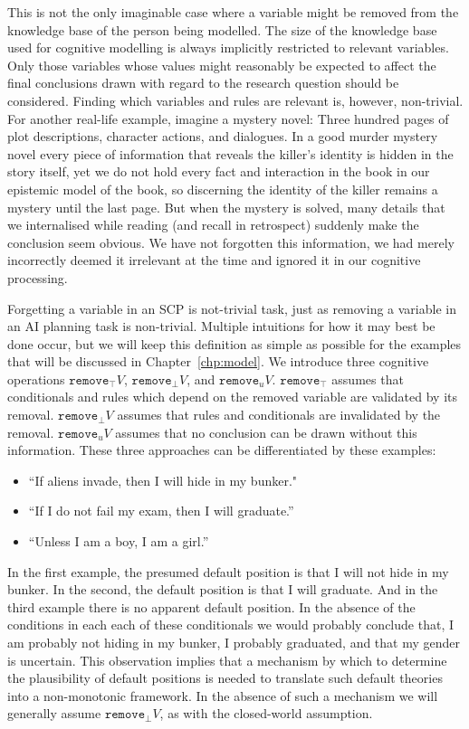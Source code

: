 This is not the only imaginable case where a variable might be removed from the knowledge base of the person being modelled. The size of the knowledge base used for cognitive modelling is always implicitly restricted to relevant variables. Only those variables whose values might reasonably be expected to affect the final conclusions drawn with regard to the research question should be considered. Finding which variables and rules are relevant is, however, non-trivial. For another real-life example, imagine a mystery novel: Three hundred pages of plot descriptions, character actions, and dialogues. In a good murder mystery novel every piece of information that reveals the killer's identity is hidden in the story itself, yet we do not hold every fact and interaction in the book in our epistemic model of the book, so discerning the identity of the killer remains a mystery until the last page. But when the mystery is solved, many details that we internalised while reading (and recall in retrospect) suddenly make the conclusion seem obvious. We have not forgotten this information, we had merely incorrectly deemed it irrelevant at the time and ignored it in our cognitive processing.

Forgetting a variable in an SCP is not-trivial task, just as removing a variable in an AI planning task is non-trivial. Multiple intuitions for how it may best be done occur, but we will keep this definition as simple as possible for the examples that will be discussed in Chapter~\ref{chp:model}. We introduce three cognitive operations $\texttt{remove}_\top V$, $\texttt{remove}_\bot V$, and $\texttt{remove}_u V$. $\texttt{remove}_\top$ assumes that conditionals and rules which depend on the removed variable are validated by its removal. $\texttt{remove}_\bot V$ assumes that rules and conditionals are invalidated by the removal. $\texttt{remove}_u V$ assumes that no conclusion can be drawn without this information.  These three approaches can be differentiated by these examples:

\begin{itemize}
\item ``If aliens invade, then I will hide in my bunker."
\item ``If I do not fail my exam, then I will graduate.''
\item ``Unless I am a boy, I am a girl.''
\end{itemize}

In the first example, the presumed default position is that I will not hide in my bunker. In the second, the default position is that I will graduate. And in the third example there is no apparent default position. In the absence of the conditions in each each of these conditionals we would probably conclude that, I am probably not hiding in my bunker, I probably graduated, and that my gender is uncertain. This observation implies that a mechanism by which to determine the plausibility of default positions is needed to translate such default theories into a non-monotonic framework. In the absence of such a mechanism we will generally assume $\texttt{remove}_\bot V$, as with the closed-world assumption.

